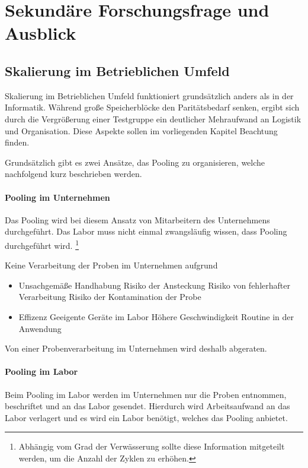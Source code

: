 \chapter{Sekundäre Forschungsfrage und Ausblick}

\section{Skalierung im Betrieblichen Umfeld}
Skalierung im Betrieblichen Umfeld funktioniert grundsätzlich anders als in der Informatik.
Während große Speicherblöcke den Paritätsbedarf senken, ergibt sich durch die Vergrößerung einer Testgruppe ein deutlicher Mehraufwand an Logistik und Organisation. 
Diese Aspekte sollen im vorliegenden Kapitel Beachtung finden.

Grundsätzlich gibt es zwei Ansätze, das Pooling zu organisieren, welche nachfolgend kurz beschrieben werden.

\subsubsection{Pooling im Unternehmen}
Das Pooling wird bei diesem Ansatz von Mitarbeitern des Unternehmens durchgeführt.
Das Labor muss nicht einmal zwangsläufig wissen, dass Pooling durchgeführt wird.
\footnote{Abhängig vom Grad der Verwässerung sollte diese Information mitgeteilt werden, um die Anzahl der Zyklen zu erhöhen.}

Keine Verarbeitung der Proben im Unternehmen aufgrund 
\begin{itemize}
	\item Unsachgemäße Handhabung
	\subitem Risiko der Ansteckung
	\subitem Risiko von fehlerhafter Verarbeitung
	\subitem Risiko der Kontamination der Probe
	\item Effizenz
	\subitem Geeigente Geräte im Labor
	\subitem Höhere Geschwindigkeit
	\subitem Routine in der Anwendung
\end{itemize}

Von einer Probenverarbeitung im Unternehmen wird deshalb abgeraten.

\subsubsection{Pooling im Labor}
Beim Pooling im Labor werden im Unternehmen nur die Proben entnommen, beschriftet und an das Labor gesendet.
Hierdurch wird Arbeitsaufwand an das Labor verlagert und es wird ein Labor benötigt, welches das Pooling anbietet.

